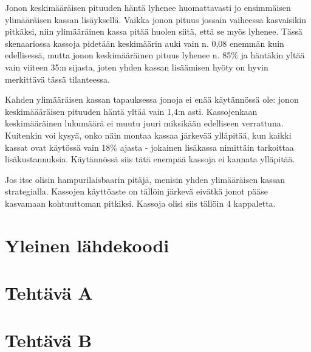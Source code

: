 \documentclass{article}     %
\begin{document}
Jonon keskimääräisen pituuden häntä lyhenee huomattavasti jo ensimmäisen ylimääräisen kassan lisäyksellä. Vaikka jonon pituus jossain vaiheessa kasvaisikin pitkäksi, niin ylimääräinen kassa pitää huolen siitä, että se myös lyhenee. Tässä skenaariossa kassoja pidetään keskimäärin auki vain n. 0,08 enemmän kuin edellisessä, mutta jonon keskimääräinen pituus lyhenee n. 85\% ja häntäkin yltää vain viiteen 35:n sijasta, joten yhden kassan lisäämisen hyöty on hyvin merkittävä tässä tilanteessa.

Kahden ylimääräisen kassan tapauksessa jonoja ei enää käytännössä ole: jonon keskimäääräisen pituuden häntä yltää vain 1,4:n asti. Kassojenkaan keskimääräinen lukumäärä ei muutu juuri miksikään edelliseen verrattuna. Kuitenkin voi kysyä, onko näin montaa kassaa järkevää ylläpitää, kun kaikki kassat ovat käytössä vain 18\% ajasta - jokainen lisäkassa nimittäin tarkoittaa lisäkustannuksia. Käytännössä siis tätä enempää kassoja ei kannata ylläpitää.

Jos itse olisin hampurilaisbaarin pitäjä, menisin yhden ylimääräisen kassan strategialla. Kassojen käyttöaste on tällöin järkevä eivätkä jonot pääse kasvamaan kohtuuttoman pitkiksi. Kassoja olisi siis tällöin 4 kappaletta.

\newpage

\appendix

\section{Yleinen lähdekoodi}





\section{Tehtävä A}



\section{Tehtävä B}
\end{document}
